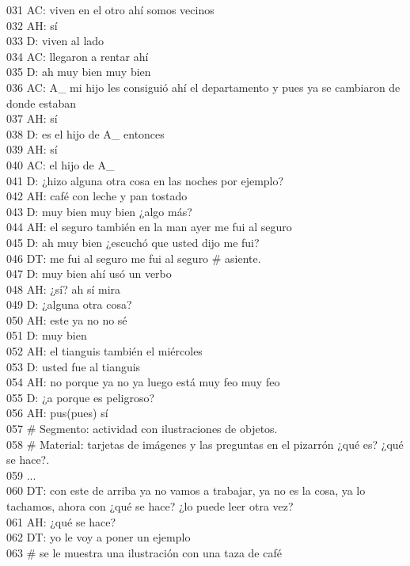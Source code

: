 031 AC: viven en el otro ahí somos vecinos\\
032 AH: sí\\
033 D: viven al lado\\
034 AC: llegaron a rentar ahí\\
035 D: ah muy bien muy bien\\
036 AC: A_ mi hijo les consiguió ahí el departamento y pues ya se cambiaron de donde estaban\\
037 AH: sí\\
038 D: es el hijo de A_ entonces\\
039 AH: sí\\
040 AC: el hijo de A_\\
041 D: ¿hizo alguna otra cosa en las noches por ejemplo?\\
042 AH: café con leche y pan tostado\\
043 D: muy bien muy bien ¿algo más?\\
044 AH: el seguro también en la man ayer me fui al seguro\\
045 D: ah muy bien ¿escuchó que usted dijo me fui?\\
046 DT: me fui al seguro me fui al seguro # asiente.\\
047 D: muy bien ahí usó un verbo\\
048 AH: ¿sí? ah sí mira\\
049 D: ¿alguna otra cosa?\\
050 AH: este ya no no sé\\
051 D: muy bien\\
052 AH: el tianguis también el miércoles\\
053 D: usted fue al tianguis\\
054 AH: no porque ya no ya luego está muy feo muy feo\\
055 D: ¿a porque es peligroso?\\
056 AH: pus(pues) sí\\
057 # Segmento: actividad con ilustraciones de objetos.\\
058 # Material: tarjetas de imágenes y las preguntas en el pizarrón ¿qué es? ¿qué se hace?.\\
059 ...\\
060 DT: con este de arriba ya no vamos a trabajar, ya no es la cosa, ya lo tachamos, ahora con ¿qué se hace? ¿lo puede leer otra vez?\\
061 AH: ¿qué se hace?\\
062 DT: yo le voy a poner un ejemplo\\
063 # se le muestra una ilustración con una taza de café\\
